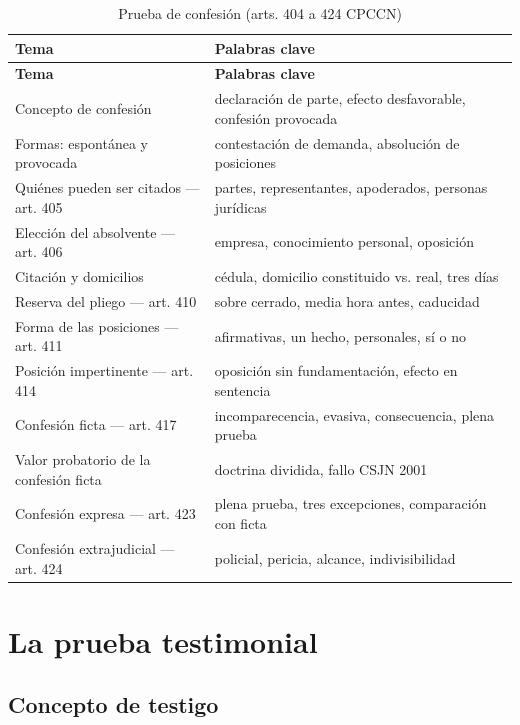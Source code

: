 \documentclass[12pt,oneside]{book}
\begin{document}
\begin{longtable}{
    >{\raggedright\arraybackslash}p{}
    >{\raggedright\arraybackslash}p{}
}
\caption{Prueba de confesión (arts. 404 a 424 CPCCN)} \\
\toprule
\textbf{Tema} & \textbf{Palabras clave} \\
\midrule
\endfirsthead
\toprule
\textbf{Tema} & \textbf{Palabras clave} \\
\midrule
\endhead
Concepto de confesión & declaración de parte, efecto desfavorable, confesión provocada \\
Formas: espontánea y provocada & contestación de demanda, absolución de posiciones \\
Quiénes pueden ser citados --- art. 405 & partes, representantes, apoderados, personas jurídicas \\
Elección del absolvente --- art. 406 & empresa, conocimiento personal, oposición \\
Citación y domicilios & cédula, domicilio constituido vs. real, tres días \\
Reserva del pliego --- art. 410 & sobre cerrado, media hora antes, caducidad \\
Forma de las posiciones --- art. 411 & afirmativas, un hecho, personales, sí o no \\
Posición impertinente --- art. 414 & oposición sin fundamentación, efecto en sentencia \\
Confesión ficta --- art. 417 & incomparecencia, evasiva, consecuencia, plena prueba \\
Valor probatorio de la confesión ficta & doctrina dividida, fallo CSJN 2001 \\
Confesión expresa --- art. 423 & plena prueba, tres excepciones, comparación con ficta \\
Confesión extrajudicial --- art. 424 & policial, pericia, alcance, indivisibilidad \\
\bottomrule
\end{longtable}

\chapter{La prueba testimonial}

\section{Concepto de testigo}
\end{document}
